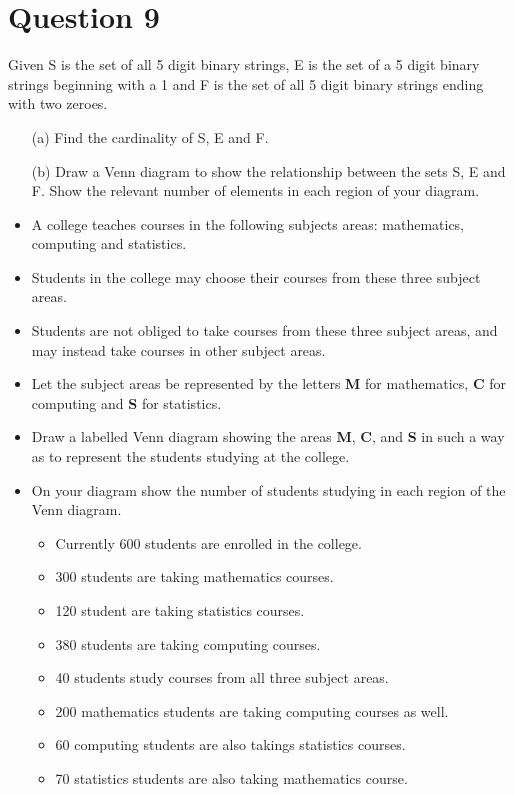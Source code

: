 \documentclass[]{report}
\begin{document}
{{{{{{%

\section*{ Question 9 }
Given S is the set of all 5 digit binary strings, E is the set of a 5 digit
binary strings beginning with a 1 and F is the set of all 5 digit binary strings ending
with two zeroes.
\begin{itemize}
\item[(a)] Find the cardinality of S, E and F.
\item[(b)] Draw a Venn diagram to show the relationship between the sets S, E and F.
Show the relevant number of elements in each region of your diagram.
\end{itemize}

\begin{itemize}
\item A college teaches courses in the following subjects areas: mathematics, computing and statistics.
\item Students in the college may choose their courses from these three subject areas.
\item Students are not obliged to take courses from these three subject areas, and may instead take courses in other subject areas. 
\item  Let the subject areas be represented by the letters \textbf{M} for mathematics, \textbf{C} for computing and \textbf{S} for statistics. \item Draw a labelled Venn diagram showing the areas \textbf{M}, \textbf{C}, and \textbf{S} in such a way as to represent the students studying at the college. \item On your diagram show the number of students studying in each region of the Venn diagram.
\begin{itemize}
\item Currently 600
students are enrolled in the college. 
\item 300 students are taking mathematics courses.
\item 120 student are taking statistics courses.
\item 380 students are taking computing courses. 
\item 40 students study courses from all three subject
areas. 
\item 200 mathematics students are taking computing courses as well. \item 60 computing students
are also takings statistics courses. \item  70 statistics students are also taking mathematics course.
\end{itemize}
\end{itemize}

}}}}}}
\end{document}
